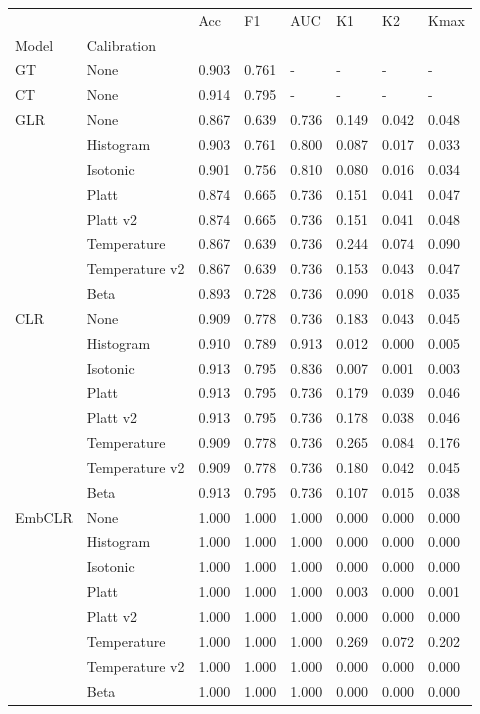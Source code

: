 \begin{tabular}{llllllll}
\toprule
 &  & Acc & F1 & AUC & K1 & K2 & Kmax \\
Model & Calibration &  &  &  &  &  &  \\
\midrule
GT & None & 0.903 & 0.761 & - & - & - & - \\
\cline{1-8}
CT & None & 0.914 & 0.795 & - & - & - & - \\
\cline{1-8}
\multirow[t]{8}{*}{GLR} & None & 0.867 & 0.639 & 0.736 & 0.149 & 0.042 & 0.048 \\
 & Histogram & 0.903 & 0.761 & 0.800 & 0.087 & 0.017 & 0.033 \\
 & Isotonic & 0.901 & 0.756 & 0.810 & 0.080 & 0.016 & 0.034 \\
 & Platt & 0.874 & 0.665 & 0.736 & 0.151 & 0.041 & 0.047 \\
 & Platt v2 & 0.874 & 0.665 & 0.736 & 0.151 & 0.041 & 0.048 \\
 & Temperature & 0.867 & 0.639 & 0.736 & 0.244 & 0.074 & 0.090 \\
 & Temperature v2 & 0.867 & 0.639 & 0.736 & 0.153 & 0.043 & 0.047 \\
 & Beta & 0.893 & 0.728 & 0.736 & 0.090 & 0.018 & 0.035 \\
\cline{1-8}
\multirow[t]{8}{*}{CLR} & None & 0.909 & 0.778 & 0.736 & 0.183 & 0.043 & 0.045 \\
 & Histogram & 0.910 & 0.789 & 0.913 & 0.012 & 0.000 & 0.005 \\
 & Isotonic & 0.913 & 0.795 & 0.836 & 0.007 & 0.001 & 0.003 \\
 & Platt & 0.913 & 0.795 & 0.736 & 0.179 & 0.039 & 0.046 \\
 & Platt v2 & 0.913 & 0.795 & 0.736 & 0.178 & 0.038 & 0.046 \\
 & Temperature & 0.909 & 0.778 & 0.736 & 0.265 & 0.084 & 0.176 \\
 & Temperature v2 & 0.909 & 0.778 & 0.736 & 0.180 & 0.042 & 0.045 \\
 & Beta & 0.913 & 0.795 & 0.736 & 0.107 & 0.015 & 0.038 \\
\cline{1-8}
\multirow[t]{8}{*}{EmbCLR} & None & 1.000 & 1.000 & 1.000 & 0.000 & 0.000 & 0.000 \\
 & Histogram & 1.000 & 1.000 & 1.000 & 0.000 & 0.000 & 0.000 \\
 & Isotonic & 1.000 & 1.000 & 1.000 & 0.000 & 0.000 & 0.000 \\
 & Platt & 1.000 & 1.000 & 1.000 & 0.003 & 0.000 & 0.001 \\
 & Platt v2 & 1.000 & 1.000 & 1.000 & 0.000 & 0.000 & 0.000 \\
 & Temperature & 1.000 & 1.000 & 1.000 & 0.269 & 0.072 & 0.202 \\
 & Temperature v2 & 1.000 & 1.000 & 1.000 & 0.000 & 0.000 & 0.000 \\
 & Beta & 1.000 & 1.000 & 1.000 & 0.000 & 0.000 & 0.000 \\
\cline{1-8}
\bottomrule
\end{tabular}
